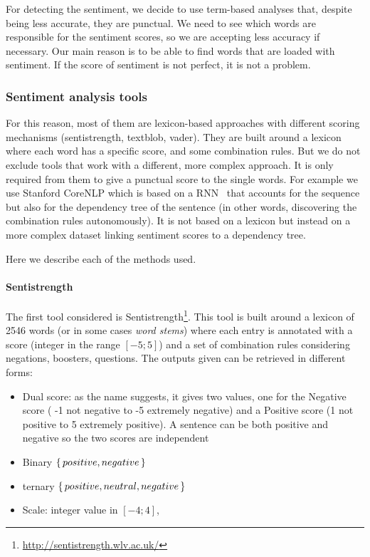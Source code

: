 For detecting the sentiment, we decide to use term-based analyses that, despite being less accurate, they are punctual. We need to see which words are responsible for the sentiment scores, so we are accepting less accuracy if necessary. Our main reason is to be able to find words that are loaded with sentiment. If the score of sentiment is not perfect, it is not a problem.

\subsubsection{\statusgreen Sentiment analysis tools}
For this reason, most of them are lexicon-based approaches with different scoring mechanisms (sentistrength, textblob, vader). They are built around a lexicon where each word has a specific score, and some combination rules. But we do not exclude tools that work with a different, more complex approach. It is only required from them to give a punctual score to the single words. For example we use Stanford CoreNLP which is based on a RNN~\citep{socher2013recursive} that accounts for the sequence but also for the dependency tree of the sentence (in other words, discovering the combination rules autonomously). It is not based on a lexicon but instead on a more complex dataset linking sentiment scores to a dependency tree.

Here we describe each of the methods used.

\paragraph{Sentistrength}
The first tool considered is Sentistrength\footnote{\url{http://sentistrength.wlv.ac.uk/}}. This tool is built around a lexicon of 2546 words (or in some cases \emph{word stems}) where each entry is annotated with a score (integer in the range $[-5;5]$) and a set of combination rules considering negations, boosters, questions. The outputs given can be retrieved in different forms:
\begin{itemize}
    \item Dual score: as the name suggests, it gives two values, one for the Negative score ( -1 not negative to -5 extremely negative) and a Positive score (1 not positive to 5 extremely positive). A sentence can be both positive and negative so the two scores are independent
    \item Binary $\set{positive, negative}$
    \item ternary $\set{positive, neutral, negative}$
    \item Scale: integer value in $[-4;4]$,
\end{itemize}

